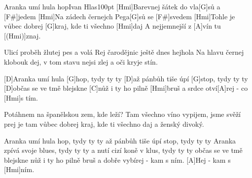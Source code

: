 \begin{song}{Aranka umí hula hop}{Ivan Hlas}{100pt}
%
[Hmi]Barevnej šátek do vla[G]sů a [F#]jedem
[Hmi]Na zádech černejch Pega[G]sů se [F#]svedem
[Hmi]Tohle je vůbec dobrej [G]kraj, kde ti všechno [Hmi]daj
A nejjemnejší z [A]vín tu [(Hmi)]znaj.
   
%
Ulicí proběh žlutej pes a volá
Rej čarodějnic ještě dnes hejhola
Na hlavu černej klobouk dej, v tom stavu nejsi zlej
a oči kryje stín.

%
[D]Aranka umí hula [G]hop, tydy ty ty
[D]až pánbůh tiše úpí [G]stop, tydy ty ty
[D]občas se ve tmě blejskne [C]nůž
i ty ho pilně [Hmi]bruš a srdce otví[A]rej - co [Hmi]s tím.
    
%
Potáhnem na španělskou zem, kde leží?
Tam všechno víno vypijem, jsme svěží
prej je tam vůbec dobrej kraj, kde ti všechno daj
a ženský divoký.

%
\rl Aranka umí hula hop, tydy ty ty
až pánbůh tiše úpí stop, tydy ty ty
Aranka zpívá svoje blues, tydy ty ty
a nutí cizí koně v klus, tydy ty ty
občas se ve tmě blejskne nůž
i ty ho pilně bruš a dobře vybírej - kam s ním.\rr{}
[A]Hej - kam s [Hmi]ním.

\end{song}
